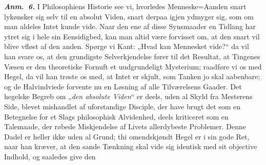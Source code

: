 \documentclass[12pt]{book}
\newcommand{\anm}[1]{\emph{\textbf{Anm.~#1.}}}
\newcommand{\opage}[1]{\marginnote{\footnotesize\textit{[#1]}}}
\begin{document}
\anm{6} I Philosophiens Historie see vi, hvorledes Menneske=Aanden snart lykønsker sig
selv til en absolut Viden, snart derpaa igjen ydmyger sig, som om man aldeles Intet
kunde vide. Naar den ene af disse Synsmaader en Tidlang har ytret sig i hele sin
Eensidigbed, kan man altid være forvisset om, at den snart vil blive vfløst af den
anden. Spørge vi Kant: „Hvad kan Mennesket vide?“ da vil han svare os, at den
grundigste Selverkjendelse fører til det Resultat, at Tingenes Væsen er den
theoretiske Fornuft et uudgrundeligt Mysterium; raadføre vi os med Hegel, da vil han
trøste os med, at Intet er skjult, som Tanken jo skal aabenbare; og de Halvindviede
forvente nu en Løsning af alle Tilværelsens Gaader. Det hegelske Begreb om „\emph{den
absolute Viden}“ er deels, uden al Skyld fra Mesterens Side, blevet mishandlet af
uforstandige Disciple, der have brugt det som en Betegnelse for et Slags philosophisk
Alvidenhed, deels kriticeret som en Talemaade, der røbede Miskjendelse af Livets
allerdybeste Problemer. Denne Dadel er
heller ikke uden al Grund; thi omendskjøndt Hegel er i sin gode Ret, naar han kræver,
at den sande Tænkning skal vide sig identisk med sit objective Indhold, og saaledes
give den
\opage{113} %
\end{document}
